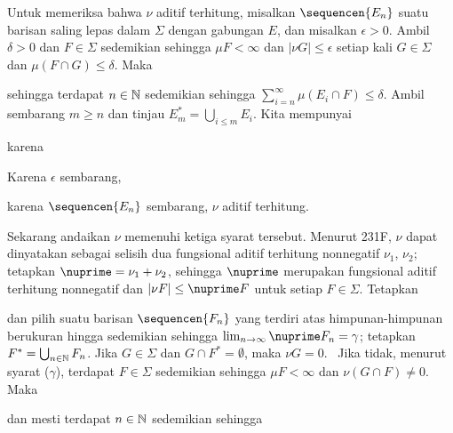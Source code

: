 {Untuk memeriksa bahwa $\nu$ aditif terhitung, misalkan
$\sequencen{E_n}$ suatu barisan saling lepas dalam $\Sigma$ dengan
gabungan $E$, dan misalkan $\epsilon>0$. Ambil $\delta>0$ dan
$F\in\Sigma$ sedemikian sehingga $\mu F<\infty$ dan
$|\nu G|\le\epsilon$ setiap kali $G\in\Sigma$ dan
$\mu(F\cap G)\le\delta$. Maka


\noindent sehingga terdapat $n\in\Bbb N$ sedemikian sehingga
$\sum_{i=n}^{\infty}\mu(E_i\cap F)\le\delta$. Ambil sembarang $m\ge n$
dan tinjau $E^*_m=\bigcup_{i\le m}E_i$. Kita mempunyai




\noindent karena


\noindent Karena $\epsilon$ sembarang,


\noindent karena $\sequencen{E_n}$ sembarang, $\nu$ aditif terhitung.

\medskip

 Sekarang andaikan $\nu$ memenuhi ketiga syarat tersebut.
Menurut 231F, $\nu$ dapat dinyatakan sebagai selisih dua fungsional aditif
terhitung nonnegatif $\nu_1$, $\nu_2$; tetapkan
$\nuprime=\nu_1+\nu_2$, sehingga $\nuprime$ merupakan fungsional aditif
terhitung nonnegatif dan $|\nu F|\le\nuprime F$ untuk setiap
$F\in\Sigma$. Tetapkan


\noindent dan pilih suatu barisan $\sequencen{F_n}$ yang terdiri atas
himpunan-himpunan berukuran hingga sedemikian sehingga
$\lim_{n\to\infty}\nuprime F_n=\gamma$; tetapkan
$F^*=\bigcup_{n\in\Bbb N}F_n$.
Jika $G\in\Sigma$ dan $G\cap F^*=\emptyset$, maka $\nu G=0$.
\Prf\Quer\
Jika tidak, menurut syarat ($\gamma$), terdapat $F\in\Sigma$
sedemikian sehingga $\mu F<\infty$ dan $\nu(G\cap F)\ne 0$. Maka

\Centerline{$\nuprime(F\setminus F^*)\ge\nuprime(F\cap G)\ge|\nu(F\cap
G)|>0$,}

\noindent dan mesti terdapat $n\in\Bbb N$ sedemikian sehingga

}

